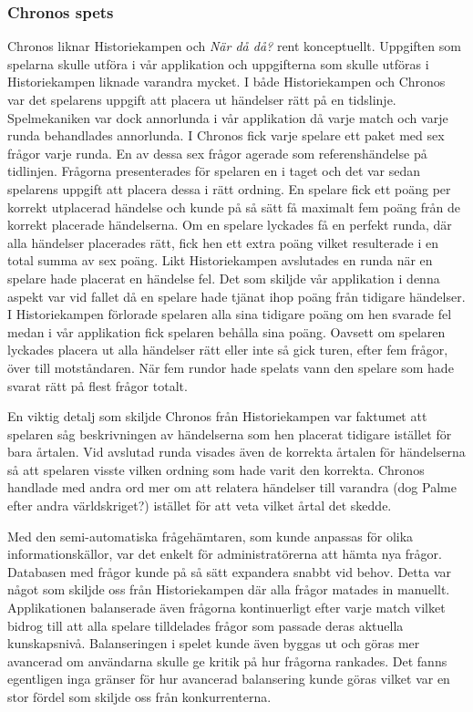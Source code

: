 \documentclass[a4paper, 11pt]{article}
\begin{document}
\subsubsection{Chronos spets}
Chronos liknar Historiekampen och \textit{När då då?} rent konceptuellt. Uppgiften som spelarna skulle utföra i vår applikation och uppgifterna som skulle utföras i Historiekampen liknade varandra mycket. I både Historiekampen och Chronos var det spelarens uppgift att placera ut händelser rätt på en tidslinje. Spelmekaniken var dock annorlunda i vår applikation då varje match och varje runda behandlades annorlunda. I Chronos fick varje spelare ett paket med sex frågor varje runda. En av dessa sex frågor agerade som referenshändelse på tidlinjen. Frågorna presenterades för spelaren en i taget och det var sedan spelarens uppgift att placera dessa i rätt ordning. En spelare fick ett poäng per korrekt utplacerad händelse och kunde på så sätt få maximalt fem poäng från de korrekt placerade händelserna. Om en spelare lyckades få en perfekt runda, där alla händelser placerades rätt, fick hen ett extra poäng vilket resulterade i en total summa av sex poäng. Likt Historiekampen avslutades en runda när en spelare hade placerat en händelse fel. Det som skiljde vår applikation i denna aspekt var vid fallet då en spelare hade tjänat ihop poäng från tidigare händelser. I Historiekampen förlorade spelaren alla sina tidigare poäng om hen svarade fel medan i vår applikation fick spelaren behålla sina poäng. Oavsett om spelaren lyckades placera ut alla händelser rätt eller inte så gick turen, efter fem frågor, över till motståndaren. När fem rundor hade spelats vann den spelare som hade svarat rätt på flest frågor totalt.  

En viktig detalj som skiljde Chronos från Historiekampen var faktumet att spelaren såg beskrivningen av händelserna som hen placerat tidigare istället för bara årtalen. Vid avslutad runda visades även de korrekta årtalen för händelserna så att spelaren visste vilken ordning som hade varit den korrekta. Chronos handlade med andra ord mer om att relatera händelser till varandra (dog Palme efter andra världskriget?) istället för att veta vilket årtal det skedde.

Med den semi-automatiska frågehämtaren, som kunde anpassas för olika informationskällor, var det enkelt för administratörerna att hämta nya frågor. Databasen med frågor kunde på så sätt expandera snabbt vid behov. Detta var något som skiljde oss från Historiekampen där alla frågor matades in manuellt. \\
Applikationen balanserade även frågorna kontinuerligt efter varje match vilket bidrog till att alla spelare tilldelades frågor som passade deras aktuella kunskapsnivå. Balanseringen i spelet kunde även byggas ut och göras mer avancerad om användarna skulle ge kritik på hur frågorna rankades. Det fanns egentligen inga gränser för hur avancerad balansering kunde göras vilket var en stor fördel som skiljde oss från konkurrenterna.
\end{document}
